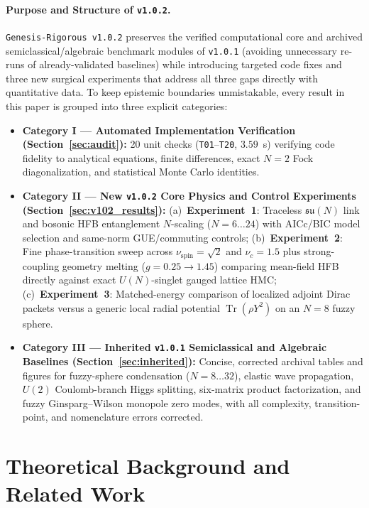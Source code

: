 \documentclass[11pt,a4paper]{article}
\DeclareMathOperator{\Tr}{Tr}
\begin{document}
\paragraph{Purpose and Structure of \texttt{v1.0.2}.}
\texttt{Genesis-Rigorous v1.0.2} preserves the verified computational core and archived semiclassical/algebraic benchmark modules of \texttt{v1.0.1} (avoiding unnecessary re-runs of already-validated baselines) while introducing targeted code fixes and three new surgical experiments that address all three gaps directly with quantitative data. To keep epistemic boundaries unmistakable, every result in this paper is grouped into three explicit categories:
\begin{itemize}
  \item \textbf{Category I — Automated Implementation Verification (Section~\ref{sec:audit}):} 20 unit checks (\texttt{T01}--\texttt{T20}, $3.59$~s) verifying code fidelity to analytical equations, finite differences, exact $N=2$ Fock diagonalization, and statistical Monte Carlo identities.
  \item \textbf{Category II — New \texttt{v1.0.2} Core Physics and Control Experiments (Section~\ref{sec:v102_results}):}
    (a)~\textbf{Experiment~1}: Traceless $\mathfrak{su}(N)$ link and bosonic HFB entanglement $N$-scaling ($N=6\dots 24$) with AICc/BIC model selection and same-norm GUE/commuting controls;
    (b)~\textbf{Experiment~2}: Fine phase-transition sweep across $\nu_{\mathrm{spin}}=\sqrt{2}$ and $\nu_c=1.5$ plus strong-coupling geometry melting ($g=0.25\to 1.45$) comparing mean-field HFB directly against exact $U(N)$-singlet gauged lattice HMC;
    (c)~\textbf{Experiment~3}: Matched-energy comparison of localized adjoint Dirac packets versus a generic local radial potential $\Tr(\rho Y^2)$ on an $N=8$ fuzzy sphere.
  \item \textbf{Category III — Inherited \texttt{v1.0.1} Semiclassical and Algebraic Baselines (Section~\ref{sec:inherited}):} Concise, corrected archival tables and figures for fuzzy-sphere condensation ($N=8\dots 32$), elastic wave propagation, $U(2)$ Coulomb-branch Higgs splitting, six-matrix product factorization, and fuzzy Ginsparg--Wilson monopole zero modes, with all complexity, transition-point, and nomenclature errors corrected.
\end{itemize}

\section{Theoretical Background and Related Work}
\label{sec:related}
\end{document}
